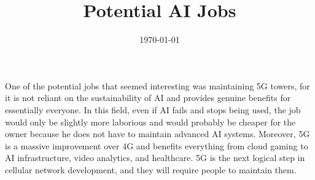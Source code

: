 \documentclass[12pt, letterpaper]{article}
\title{Potential AI Jobs}
\date{\today}
\begin{document}
\maketitle
One of the potential jobs that seemed interesting was maintaining 5G towers, for it is not reliant on the sustainability of AI and provides genuine benefits for essentially everyone. In this field, even if AI fails and stops being used, the job would only be slightly more laborious and would probably be cheaper for the owner because he does not have to maintain advanced AI systems. Moreover, 5G is a massive improvement over 4G and benefits everything from cloud gaming to AI infrastructure, video analytics, and healthcare. 5G is the next logical step in cellular network development, and they will require people to maintain them.
\end{document}
